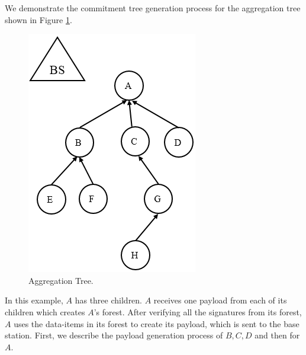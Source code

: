 	We demonstrate the commitment tree generation process for the aggregation tree shown in Figure \ref{fig:Aggregation-tree-1}.
		\begin{figure}[h!]
			\centering
			\includegraphics[scale=1]{images/aggregation-tree-1.png}
			\caption{Aggregation Tree.}
			\label{fig:Aggregation-tree-1}
		\end{figure}
		In this example, $A$ has three children. $A$ receives one payload from each of its children which creates $A$'s forest.
		After verifying all the signatures from its forest, $A$ uses the data-items in its forest to create its payload, which is sent to the base station.
		First, we describe the payload generation process of $B,C,D$ and then for $A$.

